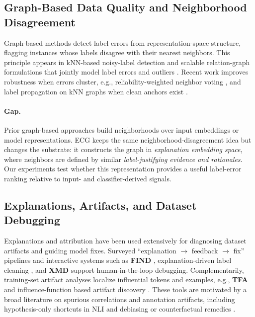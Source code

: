\documentclass[letterpaper]{article}
\begin{document}
\subsection{Graph-Based Data Quality and Neighborhood Disagreement}

Graph-based methods detect label errors from representation-space structure, flagging instances whose labels disagree with their nearest neighbors.
This principle appears in kNN-based noisy-label detection \citep{bahri2020deep} and scalable relation-graph formulations that jointly model label errors and outliers \citep{kim2023neural}.
Recent work improves robustness when errors cluster, e.g., reliability-weighted neighbor voting \citep{disalvo2025wann}, and label propagation on kNN graphs when clean anchors exist \citep{iscen2020graphnoisylabels}.

\paragraph{Gap.}
Prior graph-based approaches build neighborhoods over input embeddings or model representations.
ECG keeps the same neighborhood-disagreement idea but changes the substrate: it constructs the graph in \emph{explanation embedding space}, where neighbors are defined by similar \emph{label-justifying evidence and rationales}.
Our experiments test whether this representation provides a useful label-error ranking relative to input- and classifier-derived signals.

\subsection{Explanations, Artifacts, and Dataset Debugging}

Explanations and attribution have been used extensively for diagnosing dataset artifacts and guiding model fixes.
Surveyed ``explanation $\rightarrow$ feedback $\rightarrow$ fix'' pipelines \citep{lertvittayakumjorn2021explanation} and interactive systems such as \textbf{FIND} \citep{lertvittayakumjorn2020find}, explanation-driven label cleaning \citep{teso2021interactive}, and \textbf{XMD} \citep{lee2023xmd} support human-in-the-loop debugging.
Complementarily, training-set artifact analyses localize influential tokens and examples, e.g., \textbf{TFA} \citep{pezeshkpour2022combining} and influence-function based artifact discovery \citep{han2020influence}.
These tools are motivated by a broad literature on spurious correlations and annotation artifacts, including hypothesis-only shortcuts in NLI and debiasing or counterfactual remedies
\citep{poliak2018hypothesis,belinkov2019premise,clark2019product,utama2020self,kaushik2020learning}.
\end{document}
